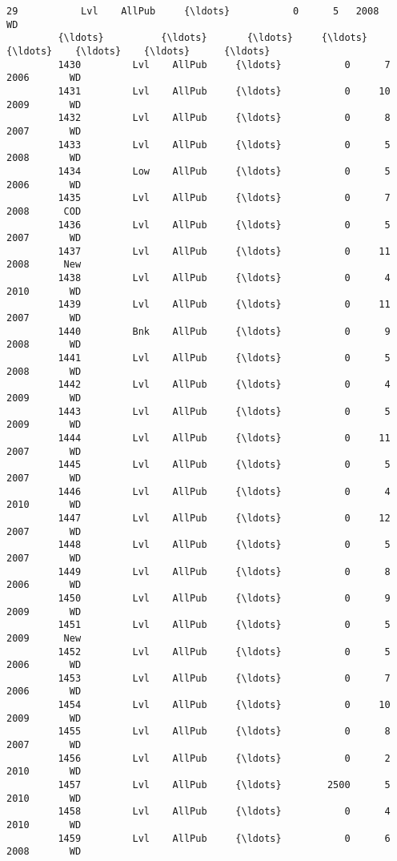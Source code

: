\documentclass[11pt]{article}
\begin{document}
\begin{Verbatim}[commandchars=\\\{\}]
         29           Lvl    AllPub     {\ldots}           0      5   2008       WD   
         {\ldots}          {\ldots}       {\ldots}     {\ldots}         {\ldots}    {\ldots}    {\ldots}      {\ldots}   
         1430         Lvl    AllPub     {\ldots}           0      7   2006       WD   
         1431         Lvl    AllPub     {\ldots}           0     10   2009       WD   
         1432         Lvl    AllPub     {\ldots}           0      8   2007       WD   
         1433         Lvl    AllPub     {\ldots}           0      5   2008       WD   
         1434         Low    AllPub     {\ldots}           0      5   2006       WD   
         1435         Lvl    AllPub     {\ldots}           0      7   2008      COD   
         1436         Lvl    AllPub     {\ldots}           0      5   2007       WD   
         1437         Lvl    AllPub     {\ldots}           0     11   2008      New   
         1438         Lvl    AllPub     {\ldots}           0      4   2010       WD   
         1439         Lvl    AllPub     {\ldots}           0     11   2007       WD   
         1440         Bnk    AllPub     {\ldots}           0      9   2008       WD   
         1441         Lvl    AllPub     {\ldots}           0      5   2008       WD   
         1442         Lvl    AllPub     {\ldots}           0      4   2009       WD   
         1443         Lvl    AllPub     {\ldots}           0      5   2009       WD   
         1444         Lvl    AllPub     {\ldots}           0     11   2007       WD   
         1445         Lvl    AllPub     {\ldots}           0      5   2007       WD   
         1446         Lvl    AllPub     {\ldots}           0      4   2010       WD   
         1447         Lvl    AllPub     {\ldots}           0     12   2007       WD   
         1448         Lvl    AllPub     {\ldots}           0      5   2007       WD   
         1449         Lvl    AllPub     {\ldots}           0      8   2006       WD   
         1450         Lvl    AllPub     {\ldots}           0      9   2009       WD   
         1451         Lvl    AllPub     {\ldots}           0      5   2009      New   
         1452         Lvl    AllPub     {\ldots}           0      5   2006       WD   
         1453         Lvl    AllPub     {\ldots}           0      7   2006       WD   
         1454         Lvl    AllPub     {\ldots}           0     10   2009       WD   
         1455         Lvl    AllPub     {\ldots}           0      8   2007       WD   
         1456         Lvl    AllPub     {\ldots}           0      2   2010       WD   
         1457         Lvl    AllPub     {\ldots}        2500      5   2010       WD   
         1458         Lvl    AllPub     {\ldots}           0      4   2010       WD   
         1459         Lvl    AllPub     {\ldots}           0      6   2008       WD   
         

\end{Verbatim}
\end{document}
